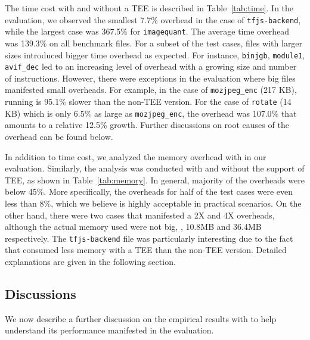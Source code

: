 

The time cost with and without a TEE is described in Table~\ref{tab:time}. 
In the evaluation, we observed the smallest 7.7\% overhead in the case of \texttt{tfjs-backend}, 
while the largest case was 367.5\% for \texttt{imagequant}. The average time overhead was 
139.3\% on all benchmark files. For a subset of the test cases, files with larger sizes introduced 
bigger time overhead as expected. For instance, \texttt{binjgb}, \texttt{module1}, \texttt{avif\_dec} 
led to an increasing level of overhead with a growing size and number of instructions. However, 
there were exceptions in the evaluation where big files manifested small overheads. For example, 
in the case of \texttt{mozjpeg\_enc} (217 KB), running \tool is 95.1\% slower than the non-TEE version. 
For the case of \texttt{rotate} (14 KB) which is only 6.5\% as large as \texttt{mozjpeg\_enc}, the 
overhead was 107.0\% that amounts to a relative 12.5\% growth. Further discussions on root causes of 
the overhead can be found below.





In addition to time cost, we analyzed the memory overhead with \tool in our evaluation. 
Similarly, the analysis was conducted with and without the support of TEE, 
as shown in Table~\ref{tab:memory}. In general, majority of the overheads were below 45\%. 
More specifically, the overheads for half of the test cases were even less than 8\%, which 
we believe is highly acceptable in practical scenarios. On the other hand, there were two cases 
that manifested a 2X and 4X overheads, although the actual memory used were not big, \ie, 10.8MB 
and 36.4MB respectively. The \texttt{tfjs-backend} file was particularly interesting due to the 
fact that \tool consumed less memory with a TEE than the non-TEE version. Detailed explanations 
are given in the following section.


\subsection{Discussions}
\label{subsec:discuss}
We now describe a further discussion on the empirical results with \tool to help understand its 
performance manifested in the evaluation. 

